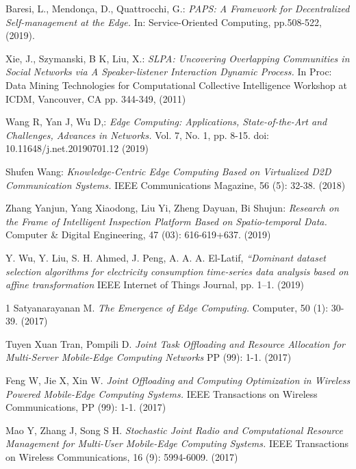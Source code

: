 \begin{thebibliography}{9}
        Baresi, L., Mendonça, D., Quattrocchi, G.: 
        \textit{PAPS: A Framework for Decentralized Self-management at the Edge.}
        In: Service-Oriented Computing, pp.508-522, (2019).   

        Xie, J., Szymanski, B K, Liu, X.:
        \textit{SLPA: Uncovering Overlapping Communities in Social Networks via
        A Speaker-listener Interaction Dynamic Process.}
        In Proc: Data Mining Technologies for Computational Collective 
        Intelligence Workshop at ICDM, Vancouver, CA pp. 344-349, (2011)

        Wang R, Yan J, Wu D,:
        \textit{Edge Computing: Applications, State-of-the-Art and Challenges, Advances in Networks.}
        Vol. 7, No. 1, pp. 8-15. doi: 10.11648/j.net.20190701.12 (2019)

        Shufen Wang:
        \textit{Knowledge-Centric Edge Computing Based on Virtualized D2D Communication Systems.}
        IEEE Communications Magazine, 56 (5): 32-38. (2018)

        Zhang Yanjun, Yang Xiaodong, Liu Yi, Zheng Dayuan, Bi Shujun:
        \textit{Research on the Frame of Intelligent Inspection Platform Based on Spatio-temporal Data.}
        Computer \& Digital Engineering, 47 (03): 616-619+637. (2019)

        Y. Wu, Y. Liu, S. H. Ahmed, J. Peng, A. A. A. El-Latif,
        \textit{“Dominant dataset selection algorithms for electricity consumption time-series data analysis based on affine transformation}
        IEEE Internet of Things Journal, pp. 1–1. (2019)

    1   Satyanarayanan M. 
        \textit{The Emergence of Edge Computing.}
        Computer, 50 (1): 30-39. (2017)
    
        Tuyen Xuan Tran, Pompili D.
        \textit{Joint Task Offloading and Resource Allocation for Multi-Server Mobile-Edge Computing Networks} PP (99): 1-1. (2017)

        Feng W, Jie X, Xin W.
        \textit{Joint Offloading and Computing Optimization in Wireless Powered Mobile-Edge Computing Systems.} 
        IEEE Transactions on Wireless Communications, PP (99): 1-1. (2017)

        Mao Y, Zhang J, Song S H.
        \textit{Stochastic Joint Radio and Computational Resource Management for Multi-User Mobile-Edge Computing Systems.} 
        IEEE Transactions on Wireless Communications, 16 (9): 5994-6009. (2017)

\end{thebibliography}